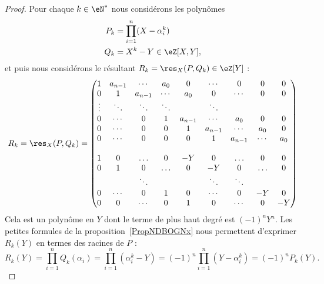 \begin{proof}
	Pour chaque \( k\in \eN^*\) nous considérons les polynômes
	\begin{subequations}
		\begin{align}
			P_k & =\prod_{i=1}^n(X-\alpha_i^k) \\
			Q_k & =X^k-Y\in \eZ[X,Y],
		\end{align}
	\end{subequations}
	et puis nous considérons le résultant \( R_k=\res_X(P,Q_k)\in \eZ[Y]\) :
	\begin{equation}
		R_k=\res_X(P,Q_k)=
		\begin{pmatrix}
			1      & a_{n-1} & \cdots  & a_0    & 0       & \cdots  & 0       & 0      & 0   \\
			0      & 1       & a_{n-1} & \cdots & a_0     & 0       & \cdots  & 0      & 0   \\
			\vdots & \ddots  & \ddots  & \ddots &         & \ddots  &                        \\
			0      & \cdots  & 0       & 1      & a_{n-1} & \cdots  & a_0     & 0      & 0   \\
			0      & \cdots  & 0       & 0      & 1       & a_{n-1} & \cdots  & a_0    & 0   \\
			0      & \cdots  & 0       & 0      & 0       & 1       & a_{n-1} & \cdots & a_0 \\
			\\
			1      & 0       & \ldots  & 0      & -Y      & 0       & \ldots  & 0      & 0   \\
			0      & 1       & 0       & \ldots & 0       & -Y      & 0       & \ldots & 0   \\
			       &         & \ddots  &        &         & \ddots  & \ddots                 \\
			0      & \cdots  & 0       & 1      & 0       & \cdots  & 0       & -Y     & 0   \\
			0      & 0       & \cdots  & 0      & 1       & 0       & \cdots  & 0      & -Y
		\end{pmatrix}
	\end{equation}
	Cela est un polynôme en \( Y\) dont le terme de plus haut degré est \( (-1)^nY^n\). Les petites formules de la proposition~\ref{PropNDBOGNx} nous permettent d'exprimer \( R_k(Y)\) en termes des racines de \( P\) :
	\begin{equation}
		R_k(Y)=\prod_{i=1}^nQ_k(\alpha_i)=\prod_{i=1}^n(\alpha_i^k-Y)=(-1)^n\prod_{i=1}^n(Y-\alpha_i^k)=(-1)^nP_k(Y).
	\end{equation}

\end{proof}
